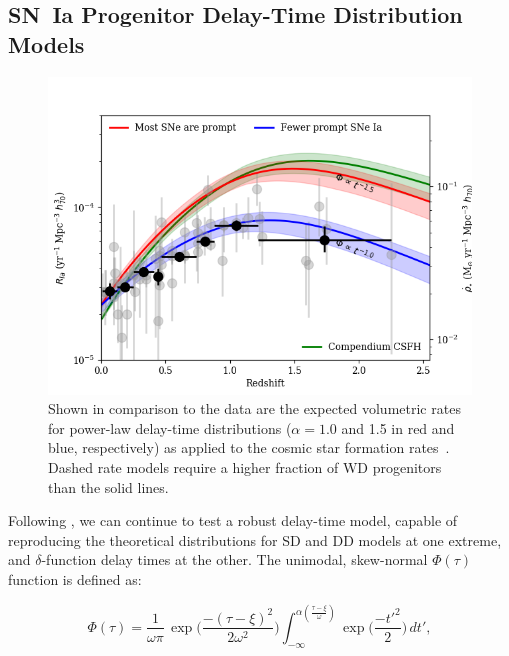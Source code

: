 \documentclass[apj]{aastex62}
\begin{document}
\subsection{SN~Ia Progenitor Delay-Time Distribution Models}

\begin{figure}[t]
   \centering
   \includegraphics[width=6.1in]{figure_SNIa_rate_alpha}
   \caption{\footnotesize Shown in comparison to the data are the expected volumetric rates for power-law delay-time distributions ($\alpha = 1.0$ and 1.5 in red and blue, respectively) as applied to the cosmic star formation rates~\cite[in  solid and dashed green, respectively]{Madau:2014fk,Driver:2018nr}. Dashed rate models require a higher fraction of WD progenitors than the solid lines.}
   \label{fig:sn1a_rates2}
\end{figure}

Following \cite{Strolger:2010}, we can continue to test a robust delay-time model, capable of reproducing the theoretical distributions for SD and DD models at one extreme, and $\delta$-function delay times at the other. The unimodal, skew-normal $\Phi(\tau)$ function is defined as:

\begin{equation}
	\Phi(\tau)=\frac{1}{\omega\pi}\,\exp\biggl(\frac{-(\tau-\xi)^2}{2\omega^2}\biggr)\int_{-\infty}^{\alpha (\frac{\tau-\xi}{\omega})} \exp\biggl(\frac{-t'^2}{2}\biggr)\,dt',
\label{eqn:model}
\end{equation}
\end{document}
